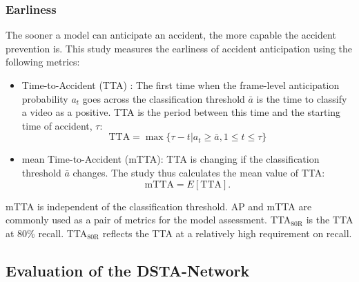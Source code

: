\documentclass[journal]{IEEEtran}
\begin{document}
\subsubsection{Earliness}
The sooner a model can anticipate an accident, the more capable the accident prevention is. This study measures the earliness of accident anticipation using the following metrics{\cite{chan2016anticipating,bao2020uncertainty,zeng2017agent,suzuki2018anticipating}}:
\begin{itemize}
    \item Time-to-Accident (TTA) : The first time when the frame-level anticipation probability $a_t$ goes across the classification threshold $\bar{a}$ is the time to classify a video as a positive. TTA is the period between this time and the starting time of accident, $\tau$: 
    \begin{equation}
        \text{TTA}=\max\{\tau-t|a_t\ge \bar{a}, 1\le t\le \tau\}
    \end{equation}
    \item mean Time-to-Accident (mTTA): TTA is changing if the classification threshold $\bar{a}$ changes. The study thus calculates the mean value of TTA: 
    \begin{equation}
        \text{mTTA}=E[\text{TTA}].
    \end{equation}
\end{itemize}
mTTA is independent of the classification threshold. AP and mTTA are commonly used as a pair of metrics for the model assessment. TTA$_{80\text{R}}$ is the TTA at 80\% recall. TTA$_{80\text{R}}$ reflects the TTA at a relatively high requirement on recall.



\subsection{Evaluation of the DSTA-Network}
\label{sub:performance_evaluation}
\end{document}
